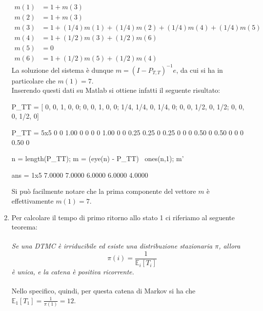 \documentclass[
	12pt, %
]{fphw}
\begin{document}
\begin{enumerate}
\begin{align*}
		m(1) &= 1 + m(3)\\
		m(2) &= 1 + m(3)\\
		m(3) &= 1 + (1/4)m(1) + (1/4)m(2) + (1/4)m(4) + (1/4)m(5)\\
		m(4) &= 1 + (1/2)m(3) + (1/2)m(6)\\
		m(5) &= 0\\
		m(6) &= 1 + (1/2)m(5) + (1/2)m(4)
	\end{align*}
	La soluzione del sistema è dunque $m = (I - P_{T,T})^{-1}e$, da cui si ha in particolare che $m(1) = 7$.\\
	Inserendo questi dati su Matlab si ottiene infatti il seguente risultato:
	\begin{matlabcode}
		P_TT = [
			0, 0, 1, 0, 0;
			0, 0, 1, 0, 0;
			1/4, 1/4, 0, 1/4, 0;
			0, 0, 1/2, 0, 1/2;
			0, 0, 0, 1/2, 0]
		\end{matlabcode}
		\begin{matlaboutput}
		P_TT = 5x5    
				0         0      1.00      0      0
				0         0      1.00      0      0
				0.25      0.25   0         0.25   0
				0         0      0.50      0      0.50
				0         0      0         0.50   0
		
		\end{matlaboutput}
		\begin{matlabcode}
		n = length(P_TT);
		m = (eye(n) - P_TT) \ ones(n,1);
		m'
		\end{matlabcode}
		\begin{matlaboutput}
		ans = 1x5    
			7.0000    7.0000    6.0000    6.0000    4.0000
		
		\end{matlaboutput}
	
	Si può facilmente notare che la prima componente del vettore $m$ è effettivamente $m(1) = 7$.
	\item Per calcolare il tempo di primo ritorno allo stato 1 ci riferiamo al seguente teorema:\\
	\\
	\null\quad \textit{Se una DTMC è irriducibile ed esiste una distribuzione stazionaria $\pi$, allora
	\begin{equation*}
		\quad\pi(i) = \frac{1}{\mathbb{E}_i [T_i]}
	\end{equation*}
	\null\quad è unica, e la catena è positiva ricorrente.}\\
	\\
	Nello specifico, quindi, per questa catena di Markov si ha che $\mathbb{E}_1 [T_1] = \frac{1}{\pi(1)} = 12$.
\end{enumerate}
\end{document}
